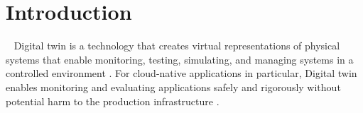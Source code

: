 











\newpage

\tableofcontents


\newpage


\chapter{Introduction}
\par{~}
Digital twin is a technology that creates virtual representations of physical systems that enable monitoring, testing, simulating, and managing systems in a controlled environment \cite{jiang_industrial_2021,glaessgen_digital_2012,pylianidis_introducing_2021}. For cloud-native applications in particular, Digital twin enables monitoring and evaluating applications safely and rigorously without potential harm to the production infrastructure \cite{bhardwaj_kubeklone_2023}.

